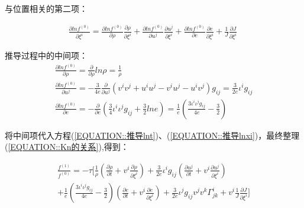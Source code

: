\documentclass[MathematicsNumericsDerivationsAndOpenFOAM.tex]{subfiles}
\begin{document}
与位置相关的第二项：

\begin{equation}
  \begin{gathered}
    \frac{\partial ln f^{(0)}}{\partial \xi^i} =
    \frac{\partial ln f^{(0)}}{\partial \rho} \frac{\partial \rho}{\partial \xi^i} +     \frac{\partial ln f^{(0)}}{\partial u^j} \frac{\partial u^j}{\partial \xi^i} +     \frac{\partial ln f^{(0)}}{\partial e} \frac{\partial e}{\partial \xi^i} + \frac{1}{J}\frac{\partial J}{\partial \xi^i}
  \end{gathered}
  \label{EQUATION::推导lnxi} ~
\end{equation}



推导过程中的中间项：
\begin{equation}
  \begin{gathered}
    \frac{\partial ln f^{(0)}}{\partial \rho}=\frac{\partial}{\partial \rho}ln \rho=\frac{1}{\rho} \\
    \frac{\partial ln f^{(0)}}{\partial u^j}=-\frac{3}{4e} \frac{\partial}{\partial u^j}(v^iv^j+u^iu^j-v^iu^j-u^iv^j)g_{ij}=\frac{3}{2e}\iota^i g_{ij} \\
    \frac{\partial ln f^{(0)}}{\partial e}=-\frac{\partial}{\partial e}(\frac{3}{4}{\iota^i\iota^jg_{ij}}+\frac{3}{2} ln e )=\frac{1}{e}(\frac{3 {\iota^i\iota^jg_{ij}}}{4e}-\frac{3}{2})
  \end{gathered}
\end{equation}


将中间项代入方程(\ref{EQUATION::推导lnt})、(\ref{EQUATION::推导lnxi})，最终整理(\ref{EQUATION::Kn的关系}),得到：






\begin{equation}
  \begin{gathered}
    \frac{f^{(1)}}{f^{(0)}}=
    -\tau [\frac{1}{\rho}(\frac{\partial \rho}{\partial t} + v^{i}\frac{\partial \rho}{\partial \xi^i}) + \frac{3}{2e}\iota^i g_{ij} (\frac{\partial u^j}{\partial t}+ v^i \frac{\partial u^j}{\partial \xi^i}) \\
      + \frac{1}{e} (\frac{3 {\iota^i\iota^jg_{ij}}}{4e}-\frac{3}{2}) (\frac{\partial e}{\partial t} + v^i \frac{\partial e}{\partial \xi^i}) + \frac{3}{2e}\iota^j g_{ij} v^{j} v^{k} \Gamma_{j k}^{i}   + v^i  \frac{1}{J}\frac{\partial J}{\partial \xi^i} ]
  \end{gathered}
\end{equation}
\end{document}
